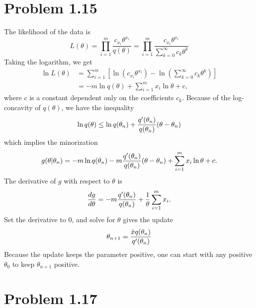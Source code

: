 \documentclass{scrartcl}
\begin{document}
\section*{Problem 1.15}
The likelihood of the data is
\begin{equation}
	L(\theta) = \prod_{i=1}^m \frac{c_{x_i}\theta^{x_i}}{q(\theta)}
	= \prod_{i=1}^m \frac{c_{x_i}\theta^{x_i}}{\sum_{k=0}^{\infty} c_k \theta^k}
\end{equation}
Taking the logarithm, we get
\begin{equation}
	\begin{split}	
	\ln L(\theta) & = \sum_{i=1}^m \left[ \ln \left( c_{x_i}\theta^{x_i} \right) 
					-\ln \left( \sum_{k=0}^{\infty} c_k \theta^k \right) \right] \\
	& = -m \ln q(\theta) + \sum_{i=1}^m x_i \ln \theta + c ,
	\end{split}	
\end{equation}
where $c$ is a constant dependent only on the coefficients $c_k$.
Because of the log-concavity of $q(\theta)$, we have the inequality
\begin{equation}
\ln q(\theta)
\le \ln q(\theta_n) + {q'(\theta_n) \over q(\theta_n)} (\theta-\theta_n)
\end{equation}
which implies the minorization
\begin{equation}
g(\theta | \theta_n) 
= -m \ln q(\theta_n) - m{q'(\theta_n) \over q(\theta_n)} (\theta-\theta_n)
  + \sum_{i=1}^m x_i \ln \theta + c .
\end{equation}
The derivative of $g$ with respect to $\theta$ is
\begin{equation}
	{d g \over {d \theta}}
	= - m{q'(\theta_n) \over q(\theta_n)} + {1 \over \theta} \sum_{i=1}^m x_i .
\end{equation}
Set the derivative to 0, and solve for $\theta$ gives the update
\begin{equation}
	\theta_{n+1} = { \bar{x} q(\theta_n) \over q'(\theta_n)}
\end{equation}
Because the update keeps the parameter positive, one can start with any positive
$\theta_0$ to keep $\theta_{n+1}$ positive. 

\section*{Problem 1.17}
\end{document}
